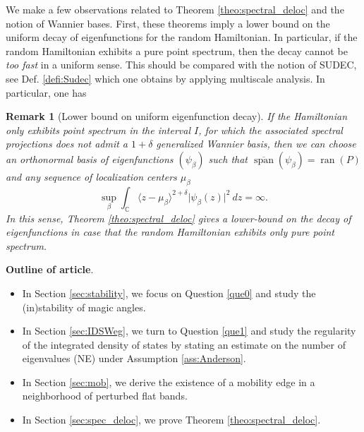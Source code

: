 \documentclass[reqno,12pt,letterpaper]{amsart}
\def\smallsection#1{\smallskip\noindent\textbf{#1}.}
\newcommand{\CC}{{\mathbb C}}
\newtheorem{rem}[theo]{Remark}
\numberwithin{equation}{section}
\begin{document}
We make a few observations related to Theorem \ref{theo:spectral_deloc} and the notion of Wannier bases. First, these theorems imply a lower bound on the uniform decay of eigenfunctions for the random Hamiltonian. In particular, if the random Hamiltonian exhibits a pure point spectrum, then the decay cannot be \emph{too fast} in a uniform sense. This should be compared with the notion of SUDEC, see Def. \ref{defi:Sudec} which one obtains by applying multiscale analysis.
In particular, one has
\begin{rem}[Lower bound on uniform eigenfunction decay]
\label{rem:uniform_decay}
If the Hamiltonian only exhibits point spectrum in the interval $I$, for which the associated spectral projections does not admit a $1+\delta$ generalized Wannier basis, then we can choose an orthonormal basis of eigenfunctions $(\psi_{\beta})$ such that $\overline{\operatorname{span}}(\psi_{\beta}) = \operatorname{ran}(P)$ and any sequence of localization centers $\mu_{\beta}$
\[ \sup_{\beta } \int_{\CC} \langle z-\mu_{\beta} \rangle^{2+\delta} \vert \psi_{\beta}(z)\vert^2 \ dz = \infty .\] 
In this sense, Theorem \ref{theo:spectral_deloc} gives a lower-bound on the decay of eigenfunctions in case that the random Hamiltonian exhibits only pure point spectrum.  
\end{rem}




\smallsection{Outline of article}
\begin{itemize}
\item In Section \ref{sec:stability}, we focus on Question \ref{que0} and study the (in)stability of magic angles. 
\item In Section \ref{sec:IDSWeg}, we turn to Question \ref{que1} and study the regularity of the integrated density of states by stating an estimate on the number of eigenvalues (NE) under Assumption \ref{ass:Anderson}.
\item In Section \ref{sec:mob}, we derive the existence of a mobility edge in a neighborhood of perturbed flat bands.
\item In Section \ref{sec:spec_deloc}, we prove Theorem \ref{theo:spectral_deloc}.
\end{itemize}
\end{document}
